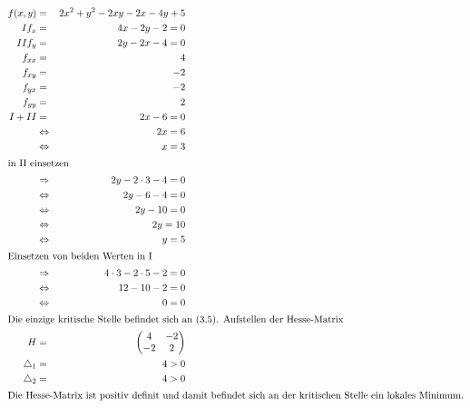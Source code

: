 \documentclass[10pt,a4paper,oneside,ngerman,numbers=noenddot]{scrartcl}
\begin{document}
\subsubsection{} %
\begin{alignat*}{2}
f(x,y) &=& 2x^{2} + y^{2} - 2xy -2x -4y + 5 \\
I f_{x} &=& 4x - 2y - 2 = 0 \\
II f_{y} &=& 2y - 2x - 4 = 0 \\
f_{xx} &=& 4 \\
f_{xy} &=& - 2 \\
f_{yx} &=& - 2 \\
f_{yy} &=& 2 \\
I + II &=& 2x -6 = 0 \\
&\Leftrightarrow & 2x = 6 \\
&\Leftrightarrow & x = 3 \\
\intertext{in II einsetzen}
&\Rightarrow & 2y - 2 \cdot 3 -4 = 0 \\
&\Leftrightarrow & 2y - 6 - 4 = 0 \\
&\Leftrightarrow & 2y - 10 = 0 \\
&\Leftrightarrow & 2y = 10 \\
&\Leftrightarrow & y = 5 \\
\intertext{Einsetzen von beiden Werten in I} 
&\Rightarrow & 4 \cdot 3 - 2 \cdot 5 - 2 = 0 \\
&\Leftrightarrow & 12 - 10 - 2 = 0 \\
&\Leftrightarrow & 0 = 0 \\
\intertext{Die einzige kritische Stelle befindet sich an (3,5). Aufstellen der Hesse-Matrix}
H &=& \begin{pmatrix} 4 & -2 \\
-2 & 2 \end{pmatrix} \\
\bigtriangleup_{1} &=& 4 > 0 \\
\bigtriangleup_{2} &=& 4 > 0 \\
\intertext{Die Hesse-Matrix ist positiv definit und damit befindet sich an der kritischen Stelle ein lokales Minimum.}
\end{alignat*}
\end{document}
